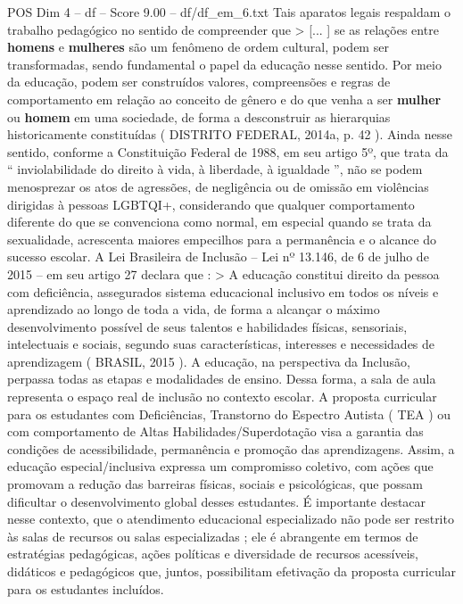 \begin{textsample}{POS Dim 4 – df – Score 9.00 – df/df\_em\_6.txt}
Tais aparatos legais respaldam o trabalho pedagógico no sentido de compreender que > [... ] se as relações entre \textbf{homens} e \textbf{mulheres} são um fenômeno de ordem cultural, podem ser transformadas, sendo fundamental o papel da educação nesse sentido.
Por meio da educação, podem ser construídos valores, compreensões e regras de comportamento em relação ao conceito de gênero e do que venha a ser \textbf{mulher} ou \textbf{homem} em uma sociedade, de forma a desconstruir as hierarquias historicamente constituídas ( DISTRITO FEDERAL, 2014a, p. 42 ).
Ainda nesse sentido, conforme a Constituição Federal de 1988, em seu artigo 5º, que trata da “ inviolabilidade do direito à vida, à liberdade, à igualdade ”, não se podem menosprezar os atos de agressões, de negligência ou de omissão em violências dirigidas à pessoas LGBTQI+, considerando que qualquer comportamento diferente do que se convenciona como normal, em especial quando se trata da sexualidade, acrescenta maiores empecilhos para a permanência e o alcance do sucesso escolar.
A Lei Brasileira de Inclusão – Lei nº 13.146, de 6 de julho de 2015 – em seu artigo 27 declara que : > A educação constitui direito da pessoa com deficiência, assegurados sistema educacional inclusivo em todos os níveis e aprendizado ao longo de toda a vida, de forma a alcançar o máximo desenvolvimento possível de seus talentos e habilidades físicas, sensoriais, intelectuais e sociais, segundo suas características, interesses e necessidades de aprendizagem ( BRASIL, 2015 ).
A educação, na perspectiva da Inclusão, perpassa todas as etapas e modalidades de ensino.
Dessa forma, a sala de aula representa o espaço real de inclusão no contexto escolar.
A proposta curricular para os estudantes com Deficiências, Transtorno do Espectro Autista ( TEA ) ou com comportamento de Altas Habilidades/Superdotação visa a garantia das condições de acessibilidade, permanência e promoção das aprendizagens.
Assim, a educação especial/inclusiva expressa um compromisso coletivo, com ações que promovam a redução das barreiras físicas, sociais e psicológicas, que possam dificultar o desenvolvimento global desses estudantes.
É importante destacar nesse contexto, que o atendimento educacional especializado não pode ser restrito às salas de recursos ou salas especializadas ; ele é abrangente em termos de estratégias pedagógicas, ações políticas e diversidade de recursos acessíveis, didáticos e pedagógicos que, juntos, possibilitam efetivação da proposta curricular para os estudantes incluídos.

\end{textsample}
